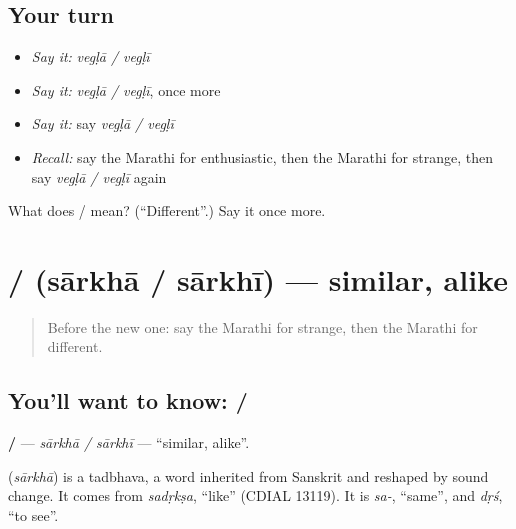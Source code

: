 \subsection*{Your turn}
\begin{itemize}
\raggedright
  \item \emph{Say it:} \emph{vegḷā / vegḷī}
  \item \emph{Say it:} \emph{vegḷā / vegḷī}, once more
  \item \emph{Say it:} say \emph{vegḷā / vegḷī}
  \item \emph{Recall:} say the Marathi for enthusiastic, then the Marathi for strange, then say \emph{vegḷā / vegḷī} again
\end{itemize}

\begin{tcolorbox}[breakable,colback=teal!4,colframe=teal!35!black,title={Before you move on}]
What does  /  mean? (\textquotedblleft{}Different\textquotedblright{}.) Say it once more.
\end{tcolorbox}
\section[\texorpdfstring{\mr{सारखा} / \mr{सारखी} (sārkhā / sārkhī)}{सारखा / सारखी (sārkhā / sārkhī)}]{ /  (sārkhā / sārkhī) — similar, alike}

\label{lesson:MR-C175-sarkha}



\begin{quote}
Before the new one: say the Marathi for strange, then the Marathi for different.
\end{quote}

\subsection*{You'll want to know:  / }
\textbf{ / } — \emph{sārkhā / sārkhī} — \textquotedblleft{}similar, alike\textquotedblright{}.

\begin{cousinweb}
\textbf{} (\emph{sārkhā}) is a tadbhava, a word inherited from Sanskrit and reshaped by sound change. It comes from \emph{sadṛkṣa}, \textquotedblleft{}like\textquotedblright{} (CDIAL 13119). It is \emph{sa-}, \textquotedblleft{}same\textquotedblright{}, and \emph{dṛś}, \textquotedblleft{}to see\textquotedblright{}.
\end{cousinweb}

